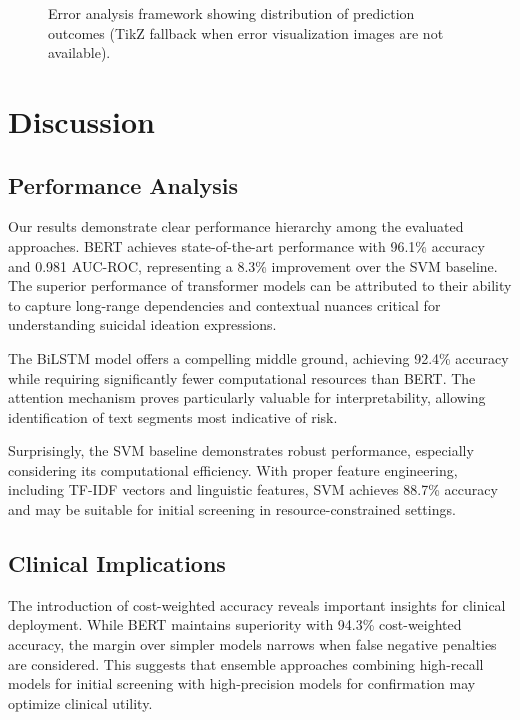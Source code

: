 \documentclass[conference]{IEEEtran}
\begin{document}
{\begin{figure}[H]
  \caption{Error analysis framework showing distribution of prediction outcomes (TikZ fallback when error visualization images are not available).}
  \label{fig:error_examples}
\end{figure}
}

\section{Discussion}

\subsection{Performance Analysis}

Our results demonstrate clear performance hierarchy among the evaluated approaches. BERT achieves state-of-the-art performance with 96.1\% accuracy and 0.981 AUC-ROC, representing a 8.3\% improvement over the SVM baseline. The superior performance of transformer models can be attributed to their ability to capture long-range dependencies and contextual nuances critical for understanding suicidal ideation expressions.

The BiLSTM model offers a compelling middle ground, achieving 92.4\% accuracy while requiring significantly fewer computational resources than BERT. The attention mechanism proves particularly valuable for interpretability, allowing identification of text segments most indicative of risk.

Surprisingly, the SVM baseline demonstrates robust performance, especially considering its computational efficiency. With proper feature engineering, including TF-IDF vectors and linguistic features, SVM achieves 88.7\% accuracy and may be suitable for initial screening in resource-constrained settings.

\subsection{Clinical Implications}

The introduction of cost-weighted accuracy reveals important insights for clinical deployment. While BERT maintains superiority with 94.3\% cost-weighted accuracy, the margin over simpler models narrows when false negative penalties are considered. This suggests that ensemble approaches combining high-recall models for initial screening with high-precision models for confirmation may optimize clinical utility.
\end{document}

